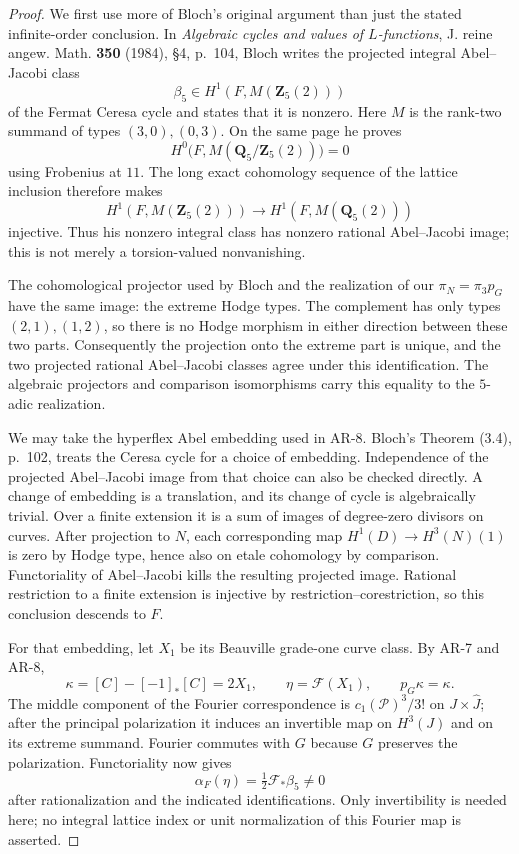 \begin{proof}
We first use more of Bloch's original argument than just the stated
infinite-order conclusion.  In \emph{Algebraic cycles and values of
$L$-functions}, J. reine angew. Math. \textbf{350} (1984), \S4,
p.~104, Bloch writes the projected integral Abel--Jacobi class
\[
 \beta_5\in H^1(F,M(\mathbf Z_5(2)))
\]
of the Fermat Ceresa cycle and states that it is nonzero.  Here $M$ is
the rank-two summand of types $(3,0),(0,3)$.  On the same page he proves
\[
 H^0\bigl(F,M(\mathbf Q_5/\mathbf Z_5(2))\bigr)=0
\]
using Frobenius at $11$.  The long exact cohomology sequence of the
lattice inclusion therefore makes
\[
 H^1(F,M(\mathbf Z_5(2)))\longrightarrow
 H^1(F,M(\mathbf Q_5(2)))
\]
injective.  Thus his nonzero integral class has nonzero rational
Abel--Jacobi image; this is not merely a torsion-valued nonvanishing.

The cohomological projector used by Bloch and the realization of our
$\pi_N=\pi_3p_G$ have the same image: the extreme Hodge types.  The
complement has only types $(2,1),(1,2)$, so there is no Hodge morphism
in either direction between these two parts.  Consequently the
projection onto the extreme part is unique, and the two projected
rational Abel--Jacobi classes agree under this identification.  The
algebraic projectors and comparison isomorphisms carry this equality
to the $5$-adic realization.

We may take the hyperflex Abel embedding used in AR-8.  Bloch's
Theorem (3.4), p.~102, treats the Ceresa cycle for a choice of
embedding.  Independence of the projected Abel--Jacobi image from
that choice can also be checked directly.  A change of embedding is
a translation, and its change of cycle is algebraically trivial.
Over a finite extension it is a sum of images of degree-zero
divisors on curves.  After projection to $N$, each corresponding
map $H^1(D)\to H^3(N)(1)$ is zero by Hodge type, hence also on
etale cohomology by comparison.  Functoriality of Abel--Jacobi kills
the resulting projected image.  Rational restriction to a finite
extension is injective by restriction--corestriction, so this
conclusion descends to $F$.

For that embedding, let $X_1$ be its Beauville grade-one curve class.
By AR-7 and AR-8,
\[
 \kappa=[C]-[-1]_*[C]=2X_1,
 \qquad \eta=\mathcal F(X_1),\qquad p_G\kappa=\kappa.
\]
The middle component of the Fourier correspondence is
$c_1(\mathcal P)^3/3!$ on $J\times\widehat J$; after the principal
polarization it induces an invertible map on $H^3(J)$ and on its
extreme summand.  Fourier commutes with $G$ because $G$ preserves
the polarization.  Functoriality now gives
\[
 \alpha_F(\eta)=\tfrac12\mathcal F_*\beta_5\ne0
\]
after rationalization and the indicated identifications.  Only
invertibility is needed here; no integral lattice index or unit
normalization of this Fourier map is asserted.


\end{proof}

